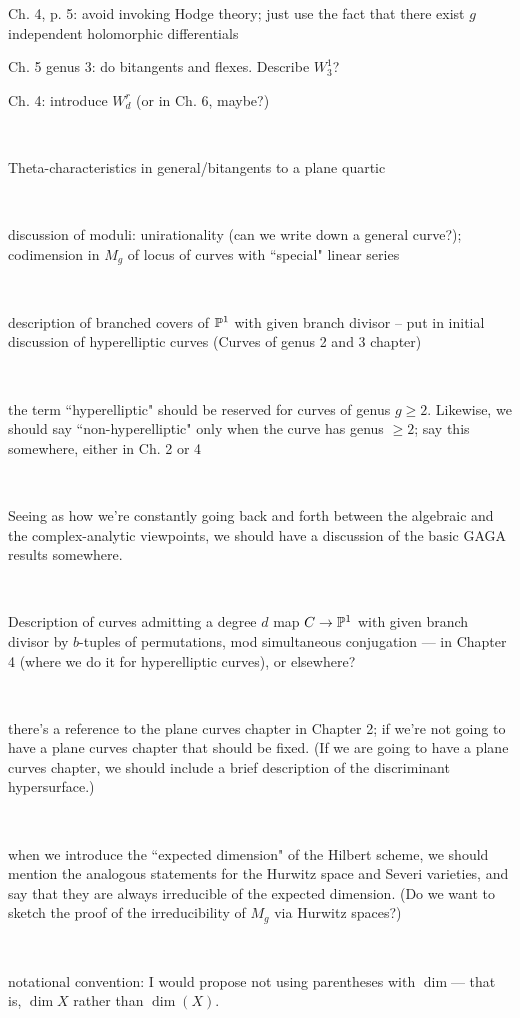 \documentclass[12pt, leqno]{book}
\begin{document}
Ch. 4, p. 5: avoid invoking Hodge theory; just use the fact that there exist $g$ independent holomorphic differentials


Ch. 5 genus 3: do bitangents and flexes. Describe $W^1_3$?

Ch. 4: introduce $W^r_d$ (or in Ch. 6, maybe?)

\

Theta-characteristics in general/bitangents to a plane quartic

\

discussion of moduli: unirationality (can we write down a general curve?); codimension in $M_g$ of locus of curves with ``special" linear series

\

description of branched covers of $\PP^1$ with given branch divisor -- put in initial discussion of hyperelliptic curves (Curves of genus 2 and 3 chapter)

\

the term ``hyperelliptic" should be reserved for curves of genus $g \geq 2$. Likewise, we should say ``non-hyperelliptic" only when the curve has genus $\geq 2$; say this somewhere, either in Ch. 2 or 4

\

Seeing as how we're constantly going back and forth between the algebraic and the complex-analytic viewpoints,  we should have a discussion of the basic GAGA results somewhere.

\

Description of curves admitting a degree $d$ map $C \to \PP^1$ with given branch divisor by $b$-tuples of permutations, mod simultaneous conjugation --- in Chapter 4 (where we do it for hyperelliptic curves), or elsewhere?

\

there's a reference to the plane curves chapter in Chapter 2; if we're not going to have a plane curves chapter that should be fixed. (If we are going to have a plane curves chapter, we should include a brief description of the discriminant hypersurface.)

\

when we introduce the ``expected dimension" of the Hilbert scheme, we should mention the analogous statements for the Hurwitz space and Severi varieties, and say that they are always irreducible of the expected dimension. (Do we want to sketch the proof of the irreducibility of $M_g$ via Hurwitz spaces?)

\

notational convention: I would propose not using parentheses with $\dim$--- that is, $\dim X$ rather than $\dim(X)$.
\end{document}
